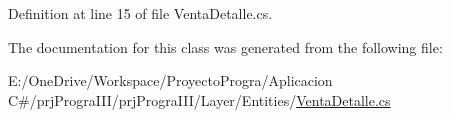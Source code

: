 Definition at line 15 of file Venta\+Detalle.\+cs.



The documentation for this class was generated from the following file\+:\begin{DoxyCompactItemize}
\item 
E\+:/\+One\+Drive/\+Workspace/\+Proyecto\+Progra/\+Aplicacion C\#/prj\+Progra\+I\+I\+I/prj\+Progra\+I\+I\+I/\+Layer/\+Entities/\hyperlink{_venta_detalle_8cs}{Venta\+Detalle.\+cs}\end{DoxyCompactItemize}
